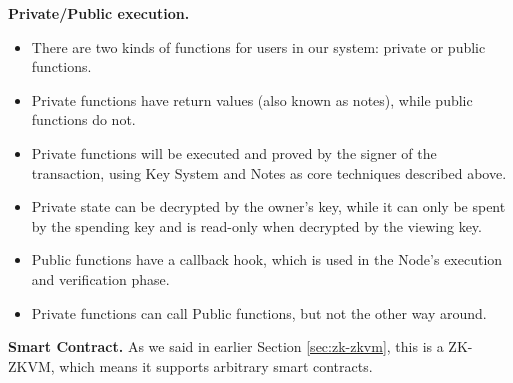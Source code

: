 \textbf{Private/Public execution.}
\begin{itemize}
    \item There are two kinds of functions for users in our system: private or public functions.
    \item Private functions have return values (also known as notes), while public functions do not.
    \item Private functions will be executed and proved by the signer of the transaction, using Key System and Notes as core techniques described above.
    \item Private state can be decrypted by the owner's key, while it can only be spent by the spending key and is read-only when decrypted by the viewing key.
    \item Public functions have a callback hook, which is used in the Node's execution and verification phase.
    \item Private functions can call Public functions, but not the other way around.
\end{itemize}
\bigskip

\textbf{Smart Contract.} As we said in earlier Section \ref{sec:zk-zkvm}, this is a ZK-ZKVM, which means it supports arbitrary smart contracts.
